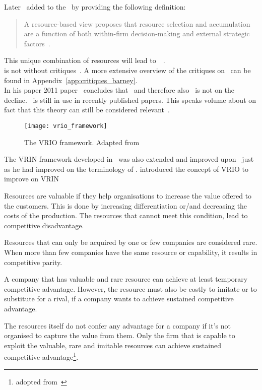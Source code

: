  
Later~\cite{Oliver:1997wj} added to the \rbt~by providing the following definition:
\begin{quote}
A resource-based view proposes that resource selection and accumulation are a function of both within-firm decision-making and external strategic factors~\citep{Oliver:1997wj}.
\end{quote}
This unique combination of resources will lead to~\ca~\citep{Barney:1991ur}. \\
\rbt is not without critiques~\citep{Narayanan:2005wy,Kraaijenbrink:2009bu,Priem:2001vd,Dung:2012wh}.
A more extensive overview of the critiques on~\citep{Barney:1991ur} can be found in Appendix~\ref{app:critiques_barney}.\\
In his paper 2011 paper~\cite{Barney:2011jp} concludes that \rbt~and therefore also \rbv~is not on the decline.
\rbt~is still in use in recently published papers.
This speaks volume about on fact that this theory can still be considered relevant~\citep{Mukherjee:2013vz,Hoskisson:2012jk,Lockett:2013jr}.

\begin{figure}[htbp] 
	\centering
	\texttt{[image: vrio\_framework]}
 	\caption[The VRIO framework]{The VRIO framework. Adapted from~\citep{rothaermel2012strategic}}\label{fig:VRIO}
\end{figure}

The VRIN framework developed in~\cite{Barney:1991ur} was also extended and improved upon~\citep{Barney:1995tz} just as he had improved on the terminology of \rbt.
\cite{Barney:1995tz} introduced the concept of \acrshort{VRIO} to improve on \acrshort{VRIN}
\begin{description} 
   \setlength{\itemsep}{1pt}
\item[The Question of Value] Resources are valuable if they help organisations to increase the value offered to the customers. This is done by increasing differentiation or/and decreasing the costs of the production. The resources that cannot meet this condition, lead to competitive disadvantage.

\item[The Question of Rarity] Resources that can only be acquired by one or few companies are considered rare. When more than few companies have the same resource or capability, it results in competitive parity.

\item[The Question of Imitability] A company that has valuable and rare resource can achieve at least temporary competitive advantage. However, the resource must also be costly to imitate or to substitute for a rival, if a company wants to achieve sustained competitive advantage.

\item[The Question of Organisation] The resources itself do not confer any advantage for a company if it’s not organised to capture the value from them. Only the firm that is capable to exploit the valuable, rare and imitable resources can achieve sustained competitive advantage\footnote{adopted from~\citep{Strategic-management-insight:2013}}.
\end{description}

